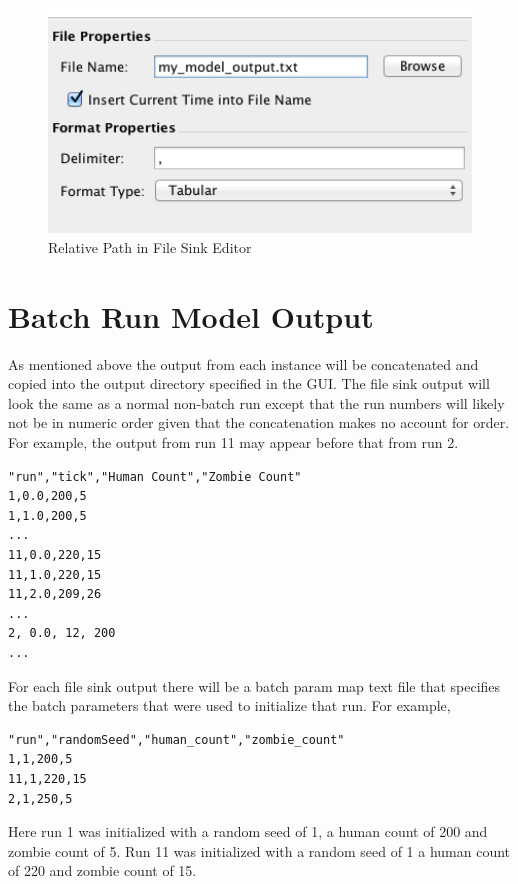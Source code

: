 \documentclass[11pt]{amsart}
\begin{document}
\begin{figure}[h]
\begin{center}
\vspace{.2in}
\centerline {
\includegraphics[width=6in]{images/file_name.png}
}
\caption{Relative Path in File Sink Editor}
\label{fig:file_name}
\end{center}
\end{figure}

\section{Batch Run Model Output}
As mentioned above the output from each instance will be concatenated and copied into the output directory specified in the GUI. The file sink output will look the same as a normal non-batch run except that the run numbers will likely not be in numeric order given that the concatenation makes no account for order. For example, the output from run 11 may appear before that from run 2.

\begin{verbatim}
"run","tick","Human Count","Zombie Count"
1,0.0,200,5
1,1.0,200,5
...
11,0.0,220,15
11,1.0,220,15
11,2.0,209,26
...
2, 0.0, 12, 200
...
\end{verbatim}

For each file sink output there will be a batch param map text file that specifies the batch parameters that were used to initialize that run. For example,

\begin{verbatim}
"run","randomSeed","human_count","zombie_count"
1,1,200,5
11,1,220,15
2,1,250,5
\end{verbatim}

Here run 1 was initialized with a random seed of 1, a human count of 200 and zombie count of 5. Run 11 was initialized with a random seed of 1 a human count of 220 and zombie count of 15.
\end{document}
